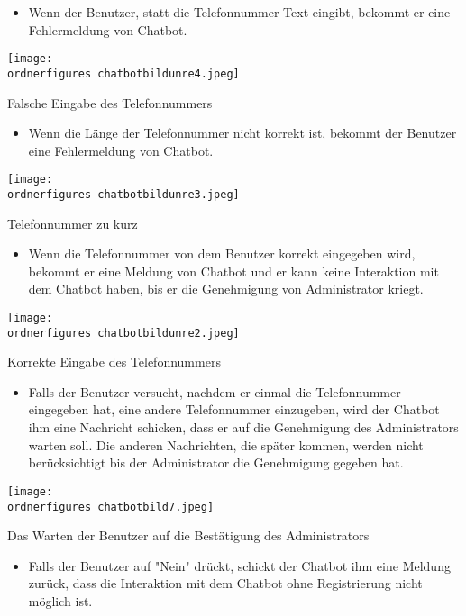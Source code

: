 \begin{itemize}
	\item Wenn der Benutzer, statt die Telefonnummer Text eingibt, bekommt er eine Fehlermeldung von Chatbot.
\end{itemize}
\begin{center}
	\captionsetup{type=figure}
	\texttt{[image: \\ordnerfigures chatbotbildunre4.jpeg]}
	\caption{Falsche Eingabe des Telefonnummers}
	\label{fig:chfdsatboregistrfds}
\end{center}
\begin{itemize}
	\item Wenn die L\"ange der Telefonnummer nicht korrekt ist, bekommt der Benutzer eine Fehlermeldung von Chatbot.
\end{itemize}
\begin{center}
	\captionsetup{type=figure}
	\texttt{[image: \\ordnerfigures chatbotbildunre3.jpeg]}
	\caption{Telefonnummer zu kurz}
	\label{fig:crboregistrfds}
\end{center}
\begin{itemize}
	\item Wenn die Telefonnummer von dem Benutzer korrekt eingegeben wird, bekommt er eine Meldung von Chatbot und er kann keine Interaktion mit dem Chatbot haben, bis er die Genehmigung von Administrator kriegt.
\end{itemize}
\begin{center}
	\captionsetup{type=figure}
	\texttt{[image: \\ordnerfigures chatbotbildunre2.jpeg]}
	\caption{Korrekte Eingabe des Telefonnummers}
	\label{fig:crboreistrfds}
\end{center}
\begin{itemize}
	\item Falls der Benutzer versucht, nachdem er einmal die Telefonnummer eingegeben hat, eine andere Telefonnummer einzugeben, wird der Chatbot ihm eine Nachricht schicken, dass er auf die Genehmigung des Administrators warten soll. Die anderen Nachrichten, die später kommen, werden nicht berücksichtigt bis der Administrator die Genehmigung gegeben hat.
\end{itemize}
\begin{center}
	\captionsetup{type=figure}
	\texttt{[image: \\ordnerfigures chatbotbild7.jpeg]}
	\caption{Das Warten der Benutzer auf die Bestätigung des Administrators}
	\label{fig:chat232bo53}
\end{center}
\begin{itemize}
	\item Falls der Benutzer auf "Nein" dr\"uckt, schickt der Chatbot ihm eine Meldung zur\"uck, dass die Interaktion mit dem Chatbot ohne Registrierung nicht m\"oglich ist.
\end{itemize}
